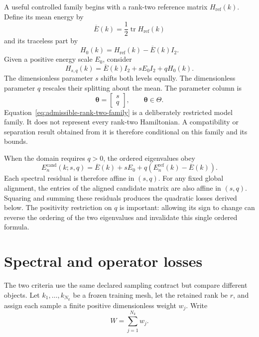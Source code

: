 A useful controlled family begins with a rank-two reference matrix
$H_{\mathrm{ref}}(k)$. Define its mean energy by
\begin{equation}
  \overline E(k)
  =
  \frac{1}{2}\operatorname{tr}H_{\mathrm{ref}}(k)
\end{equation}
and its traceless part by
\begin{equation}
  H_{0}(k)
  =
  H_{\mathrm{ref}}(k)-\overline E(k)I_2.
\end{equation}
Given a positive energy scale $E_0$, consider
\begin{equation}
  H_{s,q}(k)
  =
  \overline E(k)I_2
  +sE_0I_2
  +qH_0(k).
  \label{eq:admissible-rank-two-family}
\end{equation}
The dimensionless parameter $s$ shifts both levels equally. The dimensionless
parameter $q$ rescales their splitting about the mean. The parameter column is
\begin{equation}
  \boldsymbol\theta
  =
  \begin{bmatrix}s\\q\end{bmatrix},
  \qquad
  \boldsymbol\theta\in\Theta.
\end{equation}
Equation~\eqref{eq:admissible-rank-two-family} is a deliberately restricted
model family. It does not represent every rank-two Hamiltonian. A compatibility
or separation result obtained from it is therefore conditional on this family
and its bounds.

When the domain requires $q>0$, the ordered eigenvalues obey
\begin{equation}
  E_n^{\mathrm{cand}}(k;s,q)
  =
  \overline E(k)+sE_0
  +q\left(E_n^{\mathrm{ref}}(k)-\overline E(k)\right).
  \label{eq:admissible-rank-two-eigenvalues}
\end{equation}
Each spectral residual is therefore affine in $(s,q)$. For any fixed global
alignment, the entries of the aligned candidate matrix are also affine in
$(s,q)$. Squaring and summing these residuals produces the quadratic losses
derived below. The positivity restriction on $q$ is important: allowing its
sign to change can reverse the ordering of the two eigenvalues and invalidate
this single ordered formula.

\section{Spectral and operator losses}

The two criteria use the same declared sampling contract but compare different
objects. Let $k_1,\ldots,k_{N_k}$ be a frozen training mesh, let the retained
rank be $r$, and assign each sample a finite positive dimensionless weight
$w_j$. Write
\begin{equation}
  W=\sum_{j=1}^{N_k}w_j.
\end{equation}

